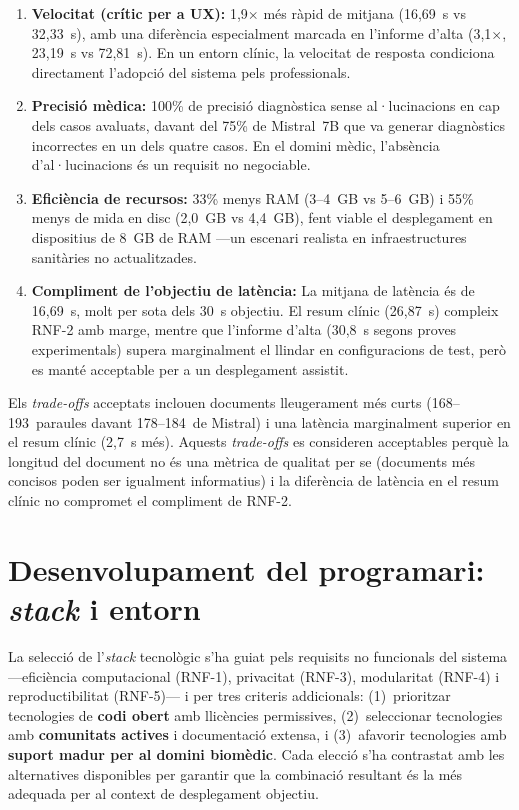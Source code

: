 \documentclass[CAT]{TFUOC}%
\begin{document}
\begin{enumerate}
    \item \textbf{Velocitat (crític per a UX):} 1,9$\times$ més ràpid de mitjana (16,69~s vs 32,33~s), amb una diferència especialment marcada en l'informe d'alta (3,1$\times$, 23,19~s vs 72,81~s). En un entorn clínic, la velocitat de resposta condiciona directament l'adopció del sistema pels professionals.

    \item \textbf{Precisió mèdica:} 100\% de precisió diagnòstica sense al·lucinacions en cap dels casos avaluats, davant del 75\% de Mistral~7B que va generar diagnòstics incorrectes en un dels quatre casos. En el domini mèdic, l'absència d'al·lucinacions és un requisit no negociable.

    \item \textbf{Eficiència de recursos:} 33\% menys RAM (3--4~GB vs 5--6~GB) i 55\% menys de mida en disc (2,0~GB vs 4,4~GB), fent viable el desplegament en dispositius de 8~GB de RAM ---un escenari realista en infraestructures sanitàries no actualitzades.

    \item \textbf{Compliment de l'objectiu de latència:} La mitjana de latència és de 16,69~s, molt per sota dels 30~s objectiu. El resum clínic (26,87~s) compleix RNF-2 amb marge, mentre que l'informe d'alta (30,8~s segons proves experimentals) supera marginalment el llindar en configuracions de test, però es manté acceptable per a un desplegament assistit.
\end{enumerate}

Els \textit{trade-offs} acceptats inclouen documents lleugerament més curts (168--193~paraules davant 178--184~de Mistral) i una latència marginalment superior en el resum clínic (2,7~s més). Aquests \textit{trade-offs} es consideren acceptables perquè la longitud del document no és una mètrica de qualitat per se (documents més concisos poden ser igualment informatius) i la diferència de latència en el resum clínic no compromet el compliment de RNF-2.

\section{Desenvolupament del programari: \textit{stack} i entorn}

La selecció de l'\textit{stack} tecnològic s'ha guiat pels requisits no funcionals del sistema ---eficiència computacional (RNF-1), privacitat (RNF-3), modularitat (RNF-4) i reproductibilitat (RNF-5)--- i per tres criteris addicionals: (1)~prioritzar tecnologies de \textbf{codi obert} amb llicències permissives, (2)~seleccionar tecnologies amb \textbf{comunitats actives} i documentació extensa, i (3)~afavorir tecnologies amb \textbf{suport madur per al domini biomèdic}. Cada elecció s'ha contrastat amb les alternatives disponibles per garantir que la combinació resultant és la més adequada per al context de desplegament objectiu.
\end{document}
